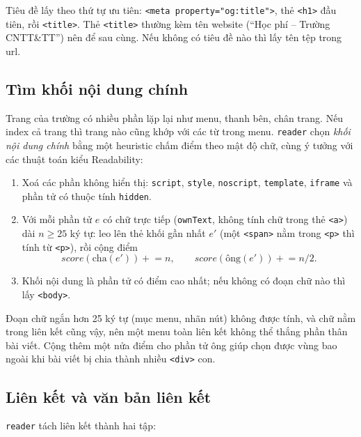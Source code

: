 \documentclass[12pt,a4paper]{report}
\begin{document}
Tiêu đề lấy theo thứ tự ưu tiên: \texttt{<meta property="og:title">}, thẻ \texttt{<h1>} đầu tiên, rồi \texttt{<title>}.
Thẻ \texttt{<title>} thường kèm tên website (``Học phí -- Trường CNTT\&TT'') nên để sau cùng. Nếu không có tiêu đề nào
thì lấy tên tệp trong url.

\subsection{Tìm khối nội dung chính}

Trang của trường có nhiều phần lặp lại như menu, thanh bên, chân trang. Nếu index cả trang thì trang nào cũng khớp với
các từ trong menu. \texttt{reader} chọn \emph{khối nội dung chính} bằng một heuristic chấm điểm theo mật độ chữ, cùng
ý tưởng với các thuật toán kiểu Readability:

\begin{enumerate}
  \item Xoá các phần không hiển thị: \texttt{script}, \texttt{style}, \texttt{noscript}, \texttt{template},
        \texttt{iframe} và phần tử có thuộc tính \texttt{hidden}.
  \item Với mỗi phần tử $e$ có chữ trực tiếp (\texttt{ownText}, không tính chữ trong thẻ \texttt{<a>}) dài
        $n \ge 25$ ký tự: leo lên thẻ khối gần nhất $e'$ (một \texttt{<span>} nằm trong \texttt{<p>} thì tính từ
        \texttt{<p>}), rồi cộng điểm
        \[
          \mathit{score}(\mathrm{cha}(e')) \mathrel{+}= n, \qquad
          \mathit{score}(\mathrm{ông}(e')) \mathrel{+}= n/2 .
        \]
  \item Khối nội dung là phần tử có điểm cao nhất; nếu không có đoạn chữ nào thì lấy \texttt{<body>}.
\end{enumerate}

Đoạn chữ ngắn hơn 25 ký tự (mục menu, nhãn nút) không được tính, và chữ nằm trong liên kết cũng vậy, nên một menu toàn
liên kết không thể thắng phần thân bài viết. Cộng thêm một nửa điểm cho phần tử ông giúp chọn được vùng bao ngoài khi
bài viết bị chia thành nhiều \texttt{<div>} con.

\subsection{Liên kết và văn bản liên kết}

\texttt{reader} tách liên kết thành hai tập:
\end{document}

